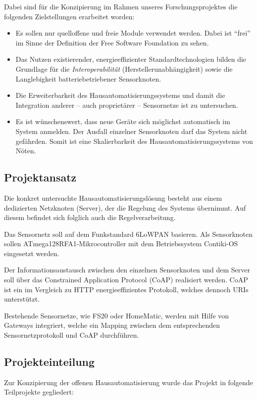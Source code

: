 	Dabei sind für die Konzipierung im Rahmen unseres Forschungsprojektes
	die folgenden Zielstellungen erarbeitet worden:
	\begin{itemize}
	\item 	Es sollen nur quelloffene und freie Module verwendet werden.
		Dabei ist \enquote{frei} im Sinne der Definition der Free
		Software Foundation zu sehen.
	\item	Das Nutzen existierender, energieeffizienter
		Standardtechnologien \autocite{dunkels04ercim, dunkels08ipso}
		bilden die Grundlage für die
		\emph{Interoperabilität} (Herstellerunabhängigkeit) sowie
		die Langlebigkeit batteriebetriebener Sensorknoten.
	\item 	Die Erweiterbarkeit des Hausautomatisierungssystems
		und damit die Integration anderer -- auch proprietärer --
		Sensornetze ist zu untersuchen.
	\item 	Es ist wünschenswert, dass neue Geräte sich möglichst
		automatisch im System anmelden. Der Ausfall einzelner
		Sensorknoten darf das System nicht gefährden.
		Somit ist eine Skalierbarkeit des Hausautomatisierungssystems
		von Nöten.
	\end{itemize}

\subsection{Projektansatz}
	Die konkret untersuchte Hausautomatisierungslösung besteht aus
	einem dedizierten Netzknoten (Server), der die Regelung des Systems
	übernimmt.
	Auf diesem befindet sich folglich auch die Regelverarbeitung.

	Das Sensornetz soll auf dem Funkstandard 6LoWPAN basieren.
	Als Sensorknoten sollen ATmega128RFA1-Mikrocontroller mit dem
	Betriebssystem Contiki-OS eingesetzt werden.

	Der Informationsaustausch zwischen den einzelnen Sensorknoten und dem
	Server soll über das Constrained Application Protocol (CoAP) realisiert
	werden.
	CoAP ist ein im Vergleich zu HTTP energieeffizientes Protokoll, welches
	dennoch URIs unterstützt.

	Bestehende Sensornetze, wie FS20 oder HomeMatic,
	werden mit Hilfe von Gateways integriert,
	welche ein Mapping zwischen dem entsprechenden Sensornetzprotokoll
	und CoAP durchführen.

\subsection{Projekteinteilung}
	Zur Konzipierung der offenen Hausautomatisierung wurde
	das Projekt in folgende Teilprojekte gegliedert:
